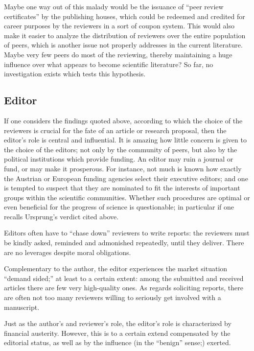 Maybe one way out of this malady would be the issuance of ``peer review
certificates'' by the publishing houses, which could be redeemed and
credited for career purposes by the reviewers in a sort of coupon
system.  This would also make it easier to analyze the distribution of
reviewers over the entire population of peers, which is another issue
not properly addresses in the current literature.  Maybe very few peers
do most of the reviewing, thereby maintaining a huge influence over what
appears to become scientific literature?   So far, no investigation
exists which tests this hypothesis.


\subsection{Editor}

If one considers the findings quoted above, according to which the
choice of the reviewers is crucial for the fate of an article or
research proposal, then the editor's role is central and influential.
It is amazing how little concern is given to the choice of the editors;
not only by the community of peers, but also by the political
institutions which provide funding.  An editor may ruin a journal or
fund, or may make it prosperous.  For instance, not much is known how
exactly the Austrian or European funding agencies select their executive
editors; and one is tempted to suspect that they are nominated to fit
the interests of important groups within the scientific communities.
Whether such procedures are optimal or even beneficial for the progress
of science is questionable; in particular if one recalls Ursprung's
verdict cited above.

Editors often have to ``chase down''
reviewers to write reports:  the reviewers must be kindly asked,
reminded and admonished repeatedly, until they deliver.  There are no
leverages despite moral obligations.

Complementary to the author, the editor experiences the
market situation ``demand sided;'' at least to a certain extent:  among
the submitted and received articles there are few very high-quality
ones.
As regards soliciting reports, there are often not too many
reviewers willing to seriously get involved with a manuscript.

Just as the author's and reviewer's role, the editor's role is
characterized by financial austerity.  However, this is to a certain
extend compensated by the editorial status, as well as by the influence
(in the ``benign'' sense;) exerted.


